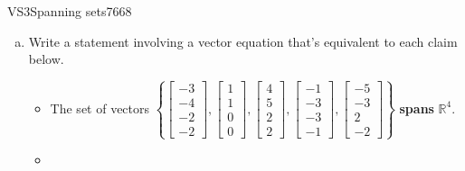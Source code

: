 \begin{exercise}{VS3}{Spanning sets}{7668} 
\begin{exerciseStatement} 

\begin{enumerate}[(a)]
\item  

 Write a statement involving a vector equation that's equivalent to each claim below. 

 

\begin{itemize}
\item  

 The set of vectors \(\left\{ \left[\begin{array}{c}
-3 \\
-4 \\
-2 \\
-2
\end{array}\right] , \left[\begin{array}{c}
1 \\
1 \\
0 \\
0
\end{array}\right] , \left[\begin{array}{c}
4 \\
5 \\
2 \\
2
\end{array}\right] , \left[\begin{array}{c}
-1 \\
-3 \\
-3 \\
-1
\end{array}\right] , \left[\begin{array}{c}
-5 \\
-3 \\
2 \\
-2
\end{array}\right] \right\}\) \textbf{spans} \(\mathbb R^4\). 

 
\item  


\end{itemize}
\end{enumerate}
\end{exerciseStatement}
\end{exercise}
